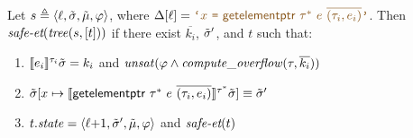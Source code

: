 {\begin{interfacelemma}
\label{lemma:interface-gep}
Let $s \triangleq \langle{\ell},{\tilde\sigma},{\tilde{\mu}},{\varphi}\rangle$,
where \textup{$\instrat{\location} = \codequote{x~\texttt{=}~\tgep~\pointertypeof{\tau}~e~\overline{(\tau_i, e_i)}}$}.
Then $\textit{safe-et}(\mathit{tree}(s, [t]))$ if there exist $\overline{k_i}$, $\tilde\sigma'$, and $t$ such that:
\begin{enumerate}
    \item $\llbracket e_i \rrbracket^{\tau_i}{\tilde\sigma} = k_i$ and $\mathit{unsat}(\varphi \land \mathit{compute\_overflow}(\tau, \overline{k_i}))$
    \item \textup{$\tilde\sigma[x \mapsto \llbracket \textsf{getelementptr}~\mathit{\tau^{*}}~e~\overline{(\tau_i, e_i)} \rrbracket^{\tau^{*}}{\tilde\sigma}] \equiv \tilde\sigma'$}
    \item $t.\mathit{state} = \langle{{\ell}{+}1},{\tilde\sigma'},{\tilde{\mu}},{\varphi}\rangle$ and $\textit{safe-et}(t)$
\end{enumerate}
\end{interfacelemma}
}
